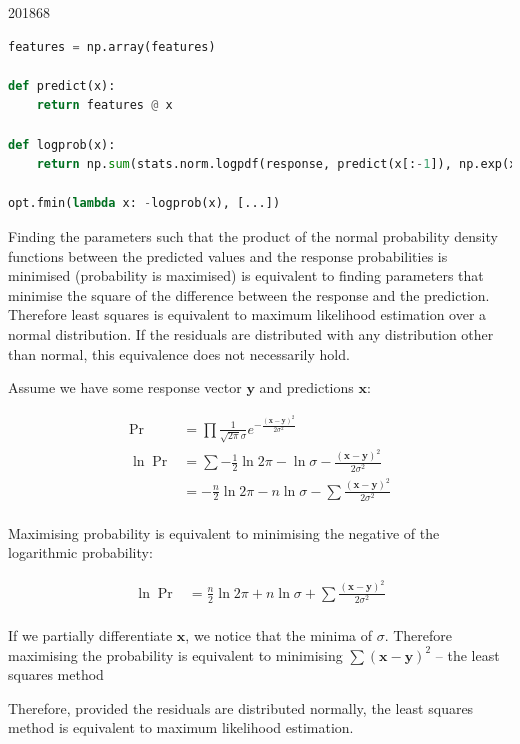 \documentclass[10pt,\jkfside,a4paper]{article}
\begin{document}
\begin{examquestion}{2018}{6}{8}
\begin{enumerate}[label=(\alph*)]
\begin{lstlisting}[language=Python]
features = np.array(features)

def predict(x):
	return features @ x

def logprob(x):
	return np.sum(stats.norm.logpdf(response, predict(x[:-1]), np.exp(x[-1])))

opt.fmin(lambda x: -logprob(x), [...])

\end{lstlisting}

Finding the parameters such that the product of the normal probability density
functions between the predicted values and the response probabilities is
minimised (probability is maximised) is equivalent to finding parameters
that minimise the square of the difference between the response and the
prediction. Therefore least squares is equivalent to maximum likelihood
estimation over a normal distribution. If the residuals are distributed with
any distribution other than normal, this equivalence does not necessarily hold.

Assume we have some response vector $\mathbf{y}$ and predictions $\mathbf{x}$:

\[
\begin{split}
\Pr &= \prod \frac{1}{\sqrt{2\pi}\sigma} e^{-\frac{(\mathbf{x} - \mathbf{y})
^2}{2\sigma^2}} \\
\ln \Pr &= \sum -\frac{1}{2}\ln 2\pi - \ln \sigma - \frac{(\mathbf{x} -
\mathbf{y})^2}{2\sigma^2} \\
&= -\frac{n}{2}\ln 2\pi - n\ln \sigma - \sum\frac{(\mathbf{x} - \mathbf{y})
^2}{2\sigma^2} \\
\end{split}
\]

Maximising probability is equivalent to minimising the negative of the
logarithmic probability:

\[
\begin{split}
\ln\Pr &= \frac{n}{2}\ln 2\pi + n\ln \sigma + \sum\frac{(\mathbf{x} -
\mathbf{y})^2}{2\sigma^2} \\
\end{split}
\]

If we partially differentiate $\mathbf{x}$, we notice that the minima
of $\sigma$. Therefore maximising the probability is equivalent to
minimising $\sum(\mathbf{x} - \mathbf{y})^2$ -- the least squares method

Therefore, provided the residuals are distributed normally, the least
squares method is equivalent to maximum likelihood estimation.

\iffalse


\end{enumerate}
\end{examquestion}
\end{document}
